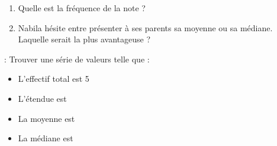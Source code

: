 \begin{enumerate}
    \item Quelle est la fréquence de la note \exDvI ?
    \item Nabila hésite entre présenter à ses parents sa moyenne ou sa médiane. Laquelle serait la plus avantageuse ? 
\end{enumerate}

\vfill

 : Trouver une série de valeurs telle que :

\begin{itemize}
    \item L'effectif total est 5
    \item L'étendue est \exEvA
    \item La moyenne est \exEvB
    \item La médiane est \exEvC
\end{itemize}

\dotfill


